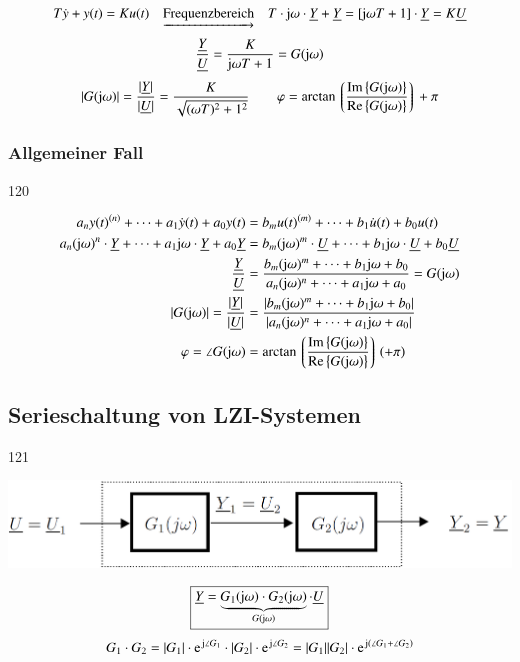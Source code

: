 
\vspace{-0.3cm} %
$$ T \dot{y} + y(t) = K u(t) \quad \underrightarrow{\text{Frequenzbereich}} \quad 
T \cdot \mathrm{j} \omega \cdot \underline{Y} + \underline{Y} = [\mathrm{j} \omega T + 1] \cdot \underline{Y} = K \underline{U} $$
$$ \frac{\underline{Y}}{\underline{U}} = \frac{K}{\mathrm{j} \omega T + 1} = G(\mathrm{j} \omega) $$
$$ |G(\mathrm{j} \omega)| = \frac{|\underline{Y}|}{|\underline{U}|} = \frac{K}{\sqrt{(\omega T)^2 + 1^2}} \qquad \varphi = \arctan \left\lgroup \frac{\operatorname{Im}\left\{G(\mathrm{j} \omega)\right\}}{\operatorname{Re}\left\{G(\mathrm{j} \omega)\right\}}\right\rgroup + \pi$$


\subsubsection{Allgemeiner Fall}{120}


\vspace{-0.5cm} %
\begin{align*}
    a_n y(t)^{(n)} + \cdots  + a_1 \dot{y}(t) + a_0 y(t) &= b_m u(t)^{(m)} + \cdots + b_1 \dot{u}(t) + b_0 u(t) \\
    a_n (\mathrm{j} \omega)^n \cdot \underline{Y} + \cdots + a_1 \mathrm{j} \omega \cdot \underline{Y} + a_0 \underline{Y} 
    &=  b_m (\mathrm{j} \omega)^m \cdot \underline{U} + \cdots + b_1 \mathrm{j} \omega \cdot \underline{U} + b_0 \underline{U} \\
    \frac{\underline{Y}}{\underline{U}} 
    &= \frac{b_m (\mathrm{j} \omega)^m + \cdots + b_1 \mathrm{j} \omega + b_0}{a_n (\mathrm{j} \omega)^n + \cdots + a_1 \mathrm{j} \omega + a_0} = G(\mathrm{j} \omega) \\
    |G(\mathrm{j} \omega)| = \frac{|\underline{Y}|}{|\underline{U}|}
    &= \frac{| b_m (\mathrm{j} \omega)^m + \cdots + b_1 \mathrm{j} \omega + b_0 |}{| a_n (\mathrm{j} \omega)^n + \cdots + a_1 \mathrm{j} \omega + a_0 |} \\
    \varphi = \angle G(\mathrm{j} \omega) &= \arctan \left\lgroup \frac{\operatorname{Im}\left\{G(\mathrm{j} \omega)\right\}}{\operatorname{Re}\left\{G(\mathrm{j} \omega)\right\}}\right\rgroup (+ \pi)
\end{align*}


\subsection{Serieschaltung von LZI-Systemen}{121}

\begin{center}
    \includegraphics[width=0.7\columnwidth]{images/frequenzgang_serieschaltung.png}
\end{center}
$$ \boxed{ \underline{Y} = \underbrace{G_1(\mathrm{j} \omega) \cdot G_2(\mathrm{j} \omega)}_{G(\mathrm{j} \omega)} \cdot \underline{U} } $$
$$ G_1 \cdot G_2 = |G_1| \cdot \e^{\jimg \angle G_1} \cdot |G_2| \cdot \e^{\jimg \angle G_2} = |G_1| |G_2| \cdot \e^{\jimg (\angle G_1 + \angle G_2)} $$


